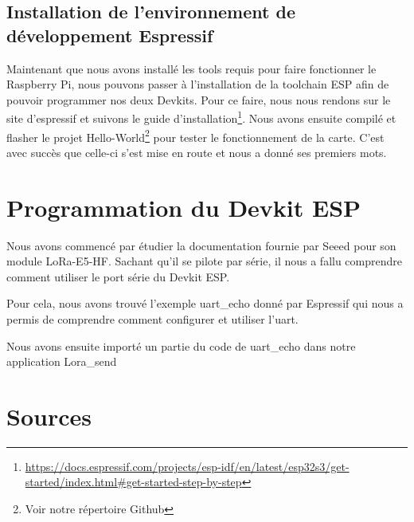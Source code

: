 \documentclass{article}
\begin{document}
		\subsection{Installation de l'environnement de développement Espressif}
			Maintenant que nous avons installé les tools requis pour faire fonctionner le Raspberry Pi, nous pouvons passer à l'installation de la toolchain ESP afin de pouvoir programmer nos deux Devkits. 
			\newline
			\newline
			Pour ce faire, nous nous rendons sur le site d'espressif et suivons le guide d'installation\footnote{\url{https://docs.espressif.com/projects/esp-idf/en/latest/esp32s3/get-started/index.html\#get-started-step-by-step}}. 
			\newline
			Nous avons ensuite compilé et flasher le projet Hello-World\footnote{Voir notre répertoire Github} pour tester le fonctionnement de la carte. C'est avec succès que celle-ci s'est mise en route et nous a donné ses premiers mots.
			
	\section{Programmation du Devkit ESP}
		Nous avons commencé par étudier la documentation fournie par Seeed pour son  module LoRa-E5-HF. Sachant qu'il se pilote par série, il nous a fallu comprendre comment utiliser le port série du Devkit ESP.
		
		Pour cela, nous avons trouvé l'exemple uart\_echo donné par Espressif qui nous a permis de comprendre comment configurer et utiliser l'uart.
		
		Nous avons ensuite importé un partie du code de uart\_echo dans notre application Lora\_send
	\newpage
	\section{Sources}
		\printbibliography
\end{document}
